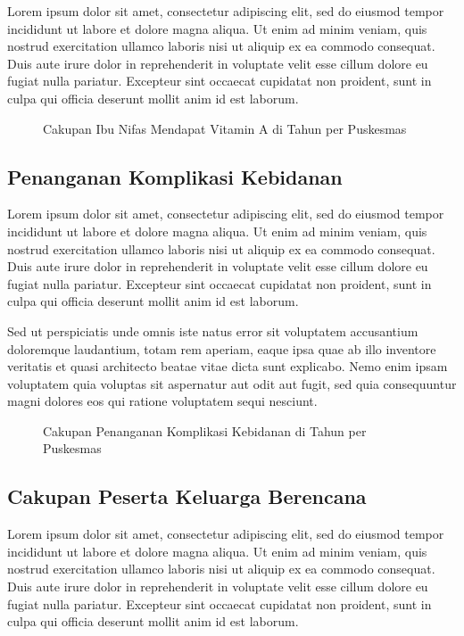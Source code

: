 Lorem ipsum dolor sit amet, consectetur adipiscing elit, sed do eiusmod tempor incididunt ut labore et dolore magna aliqua. Ut enim ad minim veniam, quis nostrud exercitation ullamco laboris nisi ut aliquip ex ea commodo consequat. Duis aute irure dolor in reprehenderit in voluptate velit esse cillum dolore eu fugiat nulla pariatur. Excepteur sint occaecat cupidatat non proident, sunt in culpa qui officia deserunt mollit anim id est laborum.

\begin{figure}[H]
    \centering{}
    \caption{Cakupan Ibu Nifas Mendapat Vitamin A di \namaKabupaten Tahun \tP per Puskesmas}
    \label{fig:Cakupan-Nifas-VitA}
\end{figure}

\subsection{Penanganan Komplikasi Kebidanan}
Lorem ipsum dolor sit amet, consectetur adipiscing elit, sed do eiusmod tempor incididunt ut labore et dolore magna aliqua. Ut enim ad minim veniam, quis nostrud exercitation ullamco laboris nisi ut aliquip ex ea commodo consequat. Duis aute irure dolor in reprehenderit in voluptate velit esse cillum dolore eu fugiat nulla pariatur. Excepteur sint occaecat cupidatat non proident, sunt in culpa qui officia deserunt mollit anim id est laborum.

Sed ut perspiciatis unde omnis iste natus error sit voluptatem accusantium doloremque laudantium, totam rem aperiam, eaque ipsa quae ab illo inventore veritatis et quasi architecto beatae vitae dicta sunt explicabo. Nemo enim ipsam voluptatem quia voluptas sit aspernatur aut odit aut fugit, sed quia consequuntur magni dolores eos qui ratione voluptatem sequi nesciunt.

\begin{figure}[H]
    \centering
    \caption{Cakupan Penanganan Komplikasi Kebidanan di \namaKabupaten Tahun \tP per Puskesmas}
    \label{fig:Cakupan-Komplikasi-Kebidanan}
\end{figure}


\subsection{Cakupan Peserta Keluarga Berencana}
Lorem ipsum dolor sit amet, consectetur adipiscing elit, sed do eiusmod tempor incididunt ut labore et dolore magna aliqua. Ut enim ad minim veniam, quis nostrud exercitation ullamco laboris nisi ut aliquip ex ea commodo consequat. Duis aute irure dolor in reprehenderit in voluptate velit esse cillum dolore eu fugiat nulla pariatur. Excepteur sint occaecat cupidatat non proident, sunt in culpa qui officia deserunt mollit anim id est laborum.

